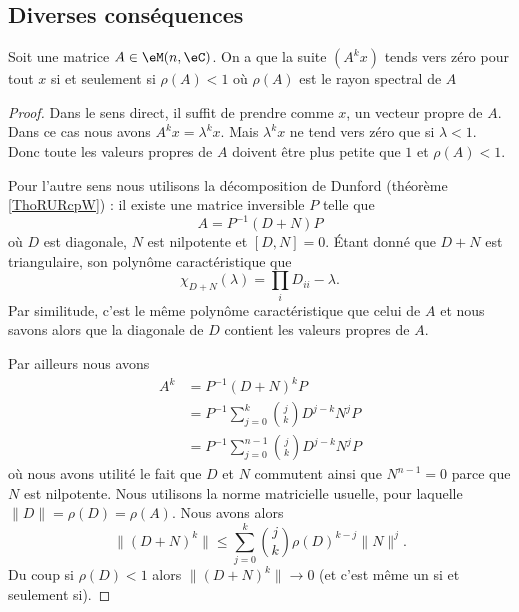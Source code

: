 \subsection{Diverses conséquences}

\begin{theorem}
    Soit une matrice \( A\in \eM(n,\eC)\). On a que la suite \( (A^kx)\) tends vers zéro pour tout \( x\) si et seulement si \( \rho(A)<1\) où \( \rho(A)\) est le rayon spectral de $A$
\end{theorem}

\begin{proof}
    Dans le sens direct, il suffit de prendre comme \( x\), un vecteur propre de \( A\). Dans ce cas nous avons \( A^kx=\lambda^kx\). Mais \( \lambda^kx\) ne tend vers zéro que si \( \lambda<1\). Donc toute les valeurs propres de \( A\) doivent être plus petite que \( 1\) et \( \rho(A)<1\).

    Pour l'autre sens nous utilisons la décomposition de Dunford (théorème \ref{ThoRURcpW}) : il existe une matrice inversible \( P\) telle que
    \begin{equation}
        A=P^{-1}(D+N)P
    \end{equation}
    où \( D\) est diagonale, \( N\) est nilpotente et \( [D,N]=0\). Étant donné que \( D+N\) est triangulaire, son polynôme caractéristique que
    \begin{equation}
        \chi_{D+N}(\lambda)=\prod_i D_{ii}-\lambda.
    \end{equation}
    Par similitude, c'est le même polynôme caractéristique que celui de \( A\) et nous savons alors que la diagonale de \( D\) contient les valeurs propres de \( A\).

    Par ailleurs nous avons
    \begin{subequations}
        \begin{align}
            A^k&=P^{-1}(D+N)^kP\\
            &=P^{-1}\sum_{j=0}^k{j\choose k}D^{j-k}N^jP\\
            &=P^{-1}\sum_{j=0}^{n-1}{j\choose k}D^{j-k}N^jP
        \end{align}
    \end{subequations}
    où nous avons utilité le fait que \( D\) et \( N\) commutent ainsi que \( N^{n-1}=0\) parce que \( N\) est nilpotente. Nous utilisons la norme matricielle usuelle, pour laquelle \( \| D \|=\rho(D)=\rho(A)\). Nous avons alors
    \begin{equation}
        \| (D+N)^k \|\leq \sum_{j=0}^k{j\choose k}\rho(D)^{k-j}\| N \|^j.
    \end{equation}
    Du coup si \( \rho(D)<1\) alors \( \| (D+N)^k \|\to 0\) (et c'est même un si et seulement si).
\end{proof}

